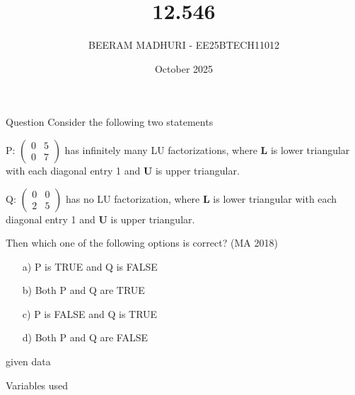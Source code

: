 \documentclass{beamer}
\title %
{12.546}
\date{October  2025}
\author %
{BEERAM MADHURI - EE25BTECH11012}
\begin{document}
\frame{\titlepage}
\begin{frame}{Question}
Consider the following two statements

P: $\begin{pmatrix} 0 & 5 \\ 0 & 7 \end{pmatrix}$ has infinitely many LU factorizations, where $\mathbf{L}$ is lower triangular with each diagonal entry 1 and $\mathbf{U}$ is upper triangular.

Q: $\begin{pmatrix} 0 & 0 \\ 2 & 5 \end{pmatrix}$ has no LU factorization, where $\mathbf{L}$ is lower triangular with each diagonal entry 1 and $\mathbf{U}$ is upper triangular.

Then which one of the following options is correct? \hfill (MA 2018)

\begin{enumerate}
    \item[a)] P is TRUE and Q is FALSE
    \item[b)] Both P and Q are TRUE
    \item[c)] P is FALSE and Q is TRUE
    \item[d)] Both P and Q are FALSE
\end{enumerate}
\end{frame}
 
\begin{frame}{given data}
\begin{table}[h!]
    \centering
    
    \caption{Variables used}
    \label{table 12.546}
\end{table}
\end{frame}
\end{document}
